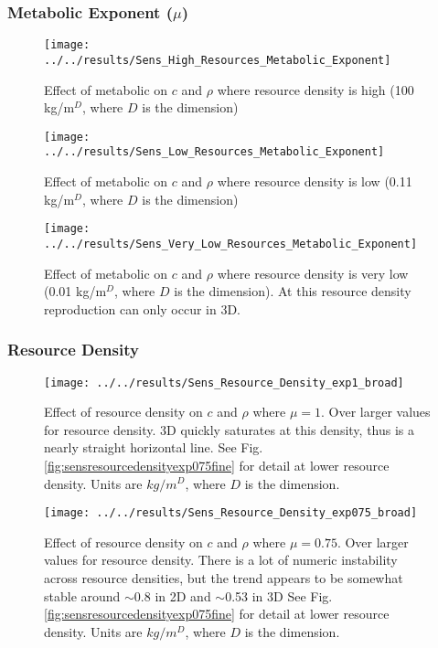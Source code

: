 \subsubsection{Metabolic Exponent ($\mu$)}
\begin{figure}[h!]
	\centering
	\texttt{[image: ../../results/Sens\_High\_Resources\_Metabolic\_Exponent]}
	\caption{Effect of metabolic on $c$ and $\rho$ where resource density is high (100 kg/m$^D$, where $D$ is the dimension)}
	\label{fig:senshighresourcesmetabolicexponent}
\end{figure}
\begin{figure}[h]
	\centering
	\texttt{[image: ../../results/Sens\_Low\_Resources\_Metabolic\_Exponent]}
	\caption{Effect of metabolic on $c$ and $\rho$ where resource density is low (0.11 kg/m$^D$, where $D$ is the dimension)}
	\label{fig:senslowresourcesmetabolicexponent}
\end{figure}
\begin{figure}
	\centering
	\texttt{[image: ../../results/Sens\_Very\_Low\_Resources\_Metabolic\_Exponent]}
	\caption{Effect of metabolic on $c$ and $\rho$ where resource density is very low (0.01 kg/m$^D$, where $D$ is the dimension).  At this resource density reproduction can only occur in 3D.}
	\label{fig:sensverylowresourcesmetabolicexponent}
\end{figure}



\subsubsection{Resource Density}

\begin{figure}[h]
	\centering
	\texttt{[image: ../../results/Sens\_Resource\_Density\_exp1\_broad]}
	\caption{Effect of resource density on $c$ and $\rho$ where $\mu = 1$.  Over larger values for resource density.  3D quickly saturates at this density, thus is a nearly straight horizontal line.  See Fig. \ref{fig:sensresourcedensityexp075fine} for detail at lower resource density.  Units are $kg/m^D$, where $D$ is the dimension.}
	\label{fig:sensresourcedensityexp1broad}
\end{figure}
\begin{figure}
	\centering
	\texttt{[image: ../../results/Sens\_Resource\_Density\_exp075\_broad]}
	\caption{Effect of resource density on $c$ and $\rho$ where $\mu = 0.75$.  Over larger values for resource density.  There is a lot of numeric instability across resource densities, but the trend appears to be somewhat stable around $\sim$0.8 in 2D and $\sim$0.53 in 3D See Fig. \ref{fig:sensresourcedensityexp075fine} for detail at lower resource density.  Units are $kg/m^D$, where $D$ is the dimension.}
	\label{fig:sensresourcedensityexp075broad}
\end{figure}






